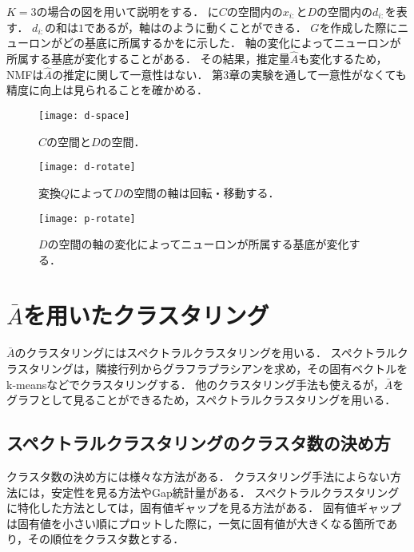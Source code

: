 $K=3$の場合の図を用いて説明をする．
に$C$の空間内の$x_{i:}$と$D$の空間内の$d_{i:}$を表す．
$d_{i:}$の和は$1$であるが，軸はのように動くことができる．
$G$を作成した際にニューロンがどの基底に所属するかをに示した．
軸の変化によってニューロンが所属する基底が変化することがある．
その結果，推定量$\hat{A}$も変化するため，NMFは$\hat{A}$の推定に関して一意性はない．
第3章の実験を通して一意性がなくても精度に向上は見られることを確かめる．

\begin{figure}[htbp]
    \begin{minipage}{0.69\hsize}
			\begin{center}
					\texttt{[image: d-space]}
					\caption{$C$の空間と$D$の空間．}
					\label{fig:d-space}
			\end{center}
		\end{minipage}
    \begin{minipage}{0.3\hsize}
			\begin{center}
					\texttt{[image: d-rotate]}
					\caption{変換$Q$によって$D$の空間の軸は回転・移動する．}
					\label{fig:d-rotate}
			\end{center}
		\end{minipage}
\end{figure}
\begin{figure}[htbp]
		\begin{center}
				\texttt{[image: p-rotate]}
				\caption{$D$の空間の軸の変化によってニューロンが所属する基底が変化する．}
				\label{fig:p-rotate}
		\end{center}
\end{figure}


\section{$\bar{A}$を用いたクラスタリング}
$\bar{A}$のクラスタリングにはスペクトラルクラスタリングを用いる．
スペクトラルクラスタリングは，隣接行列からグラフラプラシアンを求め，その固有ベクトルをk-meansなどでクラスタリングする．
他のクラスタリング手法も使えるが，$\bar{A}$をグラフとして見ることができるため，スペクトラルクラスタリングを用いる．

\subsection{スペクトラルクラスタリングのクラスタ数の決め方}
クラスタ数の決め方には様々な方法がある．
クラスタリング手法によらない方法には，安定性を見る方法\cite{Ben-Hur}やGap統計量\cite{Tibshirani}がある．
スペクトラルクラスタリングに特化した方法としては，固有値ギャップを見る方法\cite{VonLuxburg}がある．
固有値ギャップは固有値を小さい順にプロットした際に，一気に固有値が大きくなる箇所であり，その順位をクラスタ数とする．

